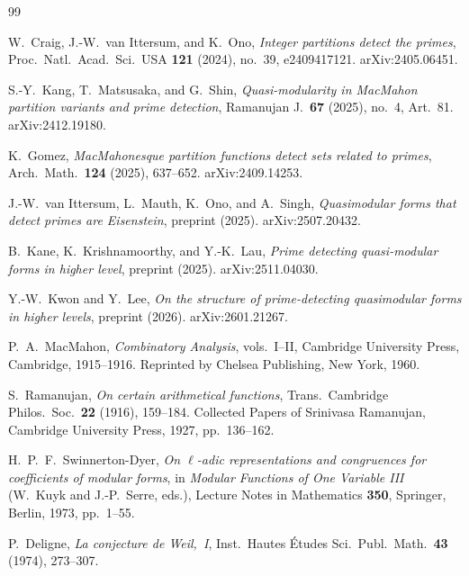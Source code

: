 \documentclass[11pt]{article}
\begin{document}
\begin{thebibliography}{99}

W.~Craig, J.-W.~van Ittersum, and K.~Ono,
\emph{Integer partitions detect the primes},
Proc.\ Natl.\ Acad.\ Sci.\ USA \textbf{121} (2024), no.~39, e2409417121.
\newblock arXiv:2405.06451.

S.-Y.~Kang, T.~Matsusaka, and G.~Shin,
\emph{Quasi-modularity in MacMahon partition variants and prime detection},
Ramanujan J.\ \textbf{67} (2025), no.~4, Art.~81.
\newblock arXiv:2412.19180.

K.~Gomez,
\emph{MacMahonesque partition functions detect sets related to primes},
Arch.\ Math.\ \textbf{124} (2025), 637--652.
\newblock arXiv:2409.14253.

J.-W.~van Ittersum, L.~Mauth, K.~Ono, and A.~Singh,
\emph{Quasimodular forms that detect primes are Eisenstein},
preprint (2025).
\newblock arXiv:2507.20432.

B.~Kane, K.~Krishnamoorthy, and Y.-K.~Lau,
\emph{Prime detecting quasi-modular forms in higher level},
preprint (2025).
\newblock arXiv:2511.04030.

Y.-W.~Kwon and Y.~Lee,
\emph{On the structure of prime-detecting quasimodular forms in higher levels},
preprint (2026).
\newblock arXiv:2601.21267.

P.~A.~MacMahon,
\emph{Combinatory Analysis}, vols.~I--II,
Cambridge University Press, Cambridge, 1915--1916.
\newblock Reprinted by Chelsea Publishing, New York, 1960.

S.~Ramanujan,
\emph{On certain arithmetical functions},
Trans.\ Cambridge Philos.\ Soc.\ \textbf{22} (1916), 159--184.
\newblock Collected Papers of Srinivasa Ramanujan, Cambridge University Press, 1927, pp.~136--162.

H.~P.~F.~Swinnerton-Dyer,
\emph{On $\ell$-adic representations and congruences for coefficients of modular forms},
in \textit{Modular Functions of One Variable III}
  (W.~Kuyk and J.-P.~Serre, eds.),
Lecture Notes in Mathematics \textbf{350}, Springer, Berlin, 1973, pp.~1--55.

P.~Deligne,
\emph{La conjecture de Weil,~I},
Inst.\ Hautes \'Etudes Sci.\ Publ.\ Math.\ \textbf{43} (1974), 273--307.


\end{thebibliography}
\end{document}
